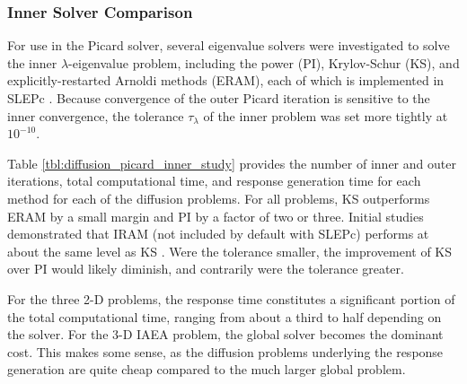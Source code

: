 \subsubsection{Inner Solver Comparison}

For use in the Picard solver, several eigenvalue solvers were investigated 
to solve the inner $\lambda$-eigenvalue problem, including the 
power (PI), Krylov-Schur (KS), and explicitly-restarted Arnoldi 
methods (ERAM), each of 
which is implemented in SLEPc \cite{slepc}.  Because convergence of the 
outer Picard iteration is  sensitive to the inner convergence, 
the tolerance $\tau_{\lambda}$ of the inner problem was set 
more tightly at $10^{-10}$.  

Table \ref{tbl:diffusion_picard_inner_study} 
provides the number of inner and outer iterations,  total
computational time, and response generation time 
for each method for each of the diffusion problems.
 For all problems, 
KS outperforms ERAM by a small margin and PI by a factor of two 
or three.  Initial studies demonstrated that IRAM (not included 
by default with SLEPc) performs at about the same level 
as KS \cite{roberts2012ksi}. Were the tolerance smaller, the improvement 
of KS over PI would 
likely diminish, and contrarily were the tolerance greater.

For the three 2-D problems, the response time constitutes a significant 
portion of the total computational time, ranging from about a third to half
depending on the solver.  For the 3-D IAEA problem, the global solver
becomes the dominant cost.  This makes some sense, as the diffusion 
problems underlying the response generation are quite cheap compared to 
the much larger global problem.

